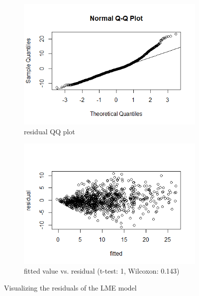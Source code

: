 \begin{figure}[H]
\centering
\begin{subfigure}{.4\textwidth}
  \centering
  \includegraphics[width=1\linewidth]{../../plots/qq_residual.png}
  \caption{residual QQ plot}
\end{subfigure}
\begin{subfigure}{.4\textwidth}
  \centering
  \includegraphics[width=1\linewidth]{../../plots/residual.png}
  \caption{fitted value vs. residual (t-test: 1, Wilcoxon: 0.143)}
\end{subfigure}
\caption{Visualizing the residuals of the LME model}
\label{fig:residual}
\end{figure}

